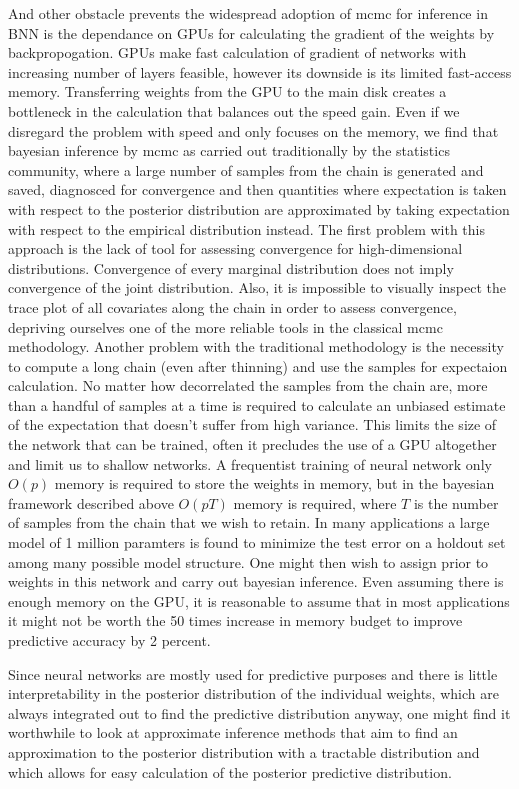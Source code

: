 \documentclass[]{report}
\begin{document}
\begin{enumerate}
And other obstacle prevents the widespread adoption of mcmc for inference in BNN
is the dependance on GPUs for calculating the gradient of the weights by
backpropogation. GPUs make fast calculation of gradient of networks with
increasing number of layers feasible, however its downside is its limited
fast-access memory. Transferring weights from the GPU to the main disk creates a
bottleneck in the calculation that balances out the speed gain. Even if we
disregard the problem with speed and only focuses on the memory, we find that
bayesian inference by mcmc as carried out traditionally by the statistics
community, where a large number of samples from the chain is generated and
saved, diagnosced for convergence and then quantities where expectation is taken
with respect to the posterior distribution are approximated by taking
expectation with respect to the empirical distribution instead. The first
problem with this approach is the lack of tool for assessing convergence for
high-dimensional distributions. Convergence of every marginal distribution does
not imply convergence of the joint distribution. Also, it is impossible to
visually inspect
the trace plot of all covariates along the chain in order to assess convergence,
depriving ourselves one of the more reliable tools in the classical mcmc
methodology. Another problem with the traditional methodology is the necessity
to compute a long chain (even after thinning) and use the samples for expectaion
calculation. No matter how decorrelated the samples from the chain are,
more than a handful of samples at a time is required to calculate an unbiased
estimate of the expectation that doesn't suffer from high variance. This limits
the size of the network that can be trained, often it precludes the use of a GPU
altogether and limit us to shallow networks. A frequentist training of neural
network only $O(p)$ memory is required to store the weights in memory, but in
the bayesian framework described above $O(pT)$ memory is required, where $T$ is
the number of samples from the chain that we wish to retain. In many
applications a large
model of 1 million paramters is found to minimize the test error on a holdout
set among many possible model structure. One might then wish to assign prior to
weights in this network and carry out bayesian inference. Even assuming there is
enough memory on the GPU, it is reasonable to assume that in most applications it might not be worth the 50 times increase in memory
budget to improve predictive accuracy by 2 percent. 

Since neural networks are 
mostly used for predictive purposes and there is little interpretability in the
posterior distribution of the individual weights, which are
always integrated out to find the predictive distribution anyway, one might find
it worthwhile to look at approximate inference methods that aim to find
an approximation to the posterior distribution with a tractable distribution and
which allows for easy calculation of the posterior predictive distribution. 


\end{enumerate}
\end{document}
